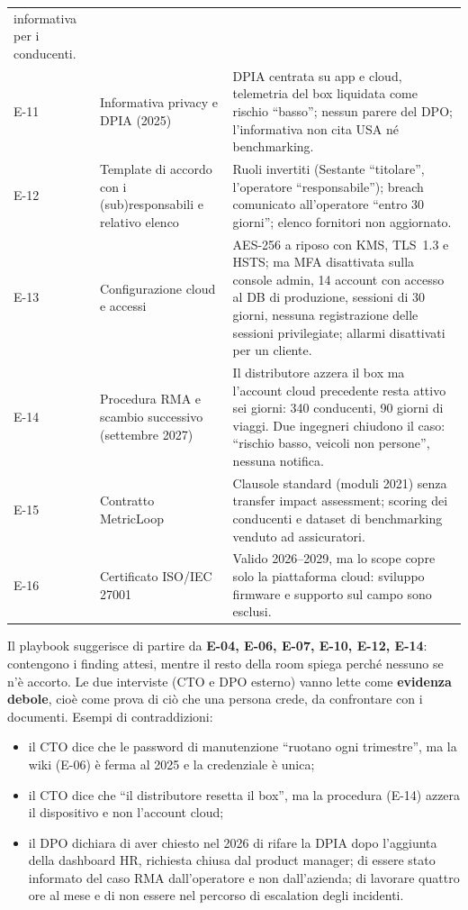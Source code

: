 {\begin{longtable}{@{}l p{4.2cm} p{8.3cm}@{}}
  informativa per i conducenti. \\
E-11 & Informativa privacy e DPIA (2025) & DPIA centrata su app e cloud, telemetria del box liquidata
  come rischio ``basso''; nessun parere del DPO; l'informativa non cita USA né benchmarking. \\
E-12 & Template di accordo con i (sub)responsabili e relativo elenco & Ruoli invertiti (Sestante
  ``titolare'', l'operatore ``responsabile''); breach comunicato all'operatore ``entro 30 giorni'';
  elenco fornitori non aggiornato. \\
E-13 & Configurazione cloud e accessi & AES-256 a riposo con KMS, TLS~1.3 e HSTS; ma MFA disattivata
  sulla console admin, 14 account con accesso al DB di produzione, sessioni di 30 giorni, nessuna
  registrazione delle sessioni privilegiate; allarmi disattivati per un cliente. \\
E-14 & Procedura RMA e scambio successivo (settembre 2027) & Il distributore azzera il box ma
  l'account cloud precedente resta attivo sei giorni: 340 conducenti, 90 giorni di viaggi. Due
  ingegneri chiudono il caso: ``rischio basso, veicoli non persone'', nessuna notifica. \\
E-15 & Contratto MetricLoop & Clausole standard (moduli 2021) senza transfer impact assessment;
  scoring dei conducenti e dataset di benchmarking venduto ad assicuratori. \\
E-16 & Certificato ISO/IEC 27001 & Valido 2026--2029, ma lo scope copre solo la piattaforma cloud:
  sviluppo firmware e supporto sul campo sono esclusi. \\
\bottomrule
\end{longtable}}

\noindent Il playbook suggerisce di partire da \textbf{E-04, E-06, E-07, E-10, E-12, E-14}: contengono
i finding attesi, mentre il resto della room spiega perché nessuno se n'è accorto. Le due interviste
(CTO e DPO esterno) vanno lette come \textbf{evidenza debole}, cioè come prova di ciò che una persona
crede, da confrontare con i documenti. Esempi di contraddizioni:
\begin{itemize}
  \item il CTO dice che le password di manutenzione ``ruotano ogni trimestre'', ma la wiki (E-06) è
    ferma al 2025 e la credenziale è unica;
  \item il CTO dice che ``il distributore resetta il box'', ma la procedura (E-14) azzera il
    dispositivo e non l'account cloud;
  \item il DPO dichiara di aver chiesto nel 2026 di rifare la DPIA dopo l'aggiunta della dashboard HR,
    richiesta chiusa dal product manager; di essere stato informato del caso RMA dall'operatore e non
    dall'azienda; di lavorare quattro ore al mese e di non essere nel percorso di escalation degli
    incidenti.
\end{itemize}


